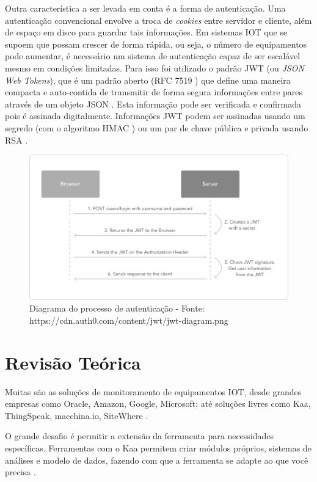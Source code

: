 Outra característica a ser levada em conta é a forma de autenticação.
Uma autenticação convencional envolve a troca de \emph{cookies} entre
servidor e cliente, além de espaço em disco para guardar tais
informações. Em sistemas IOT que se supoem que possam crescer de forma
rápida, ou seja, o número de equipamentos pode aumentar, é necessário um
sistema de autenticação capaz de ser escalável mesmo em condições
limitadas. Para isso foi utilizado o padrão JWT (ou \emph{JSON Web
Tokens}), que é um padrão aberto (RFC 7519 \cite{rfc7519-2015}) que
define uma maneira compacta e auto-contida de transmitir de forma segura
informações entre pares através de um objeto JSON \cite{jwt-2016}. Esta
informação pode ser verificada e confirmada pois é assinada
digitalmente. Informações JWT podem ser assinadas usando um segredo (com
o algoritmo HMAC \cite{rfc2104-1997}) ou um par de chave pública e
privada usando RSA \cite{rfc3447-2003}.

\begin{figure}[h]
    \centering
    \includegraphics[scale=0.3]{img/jwt-diagram-grey.png}
    \caption{Diagrama do processo de autenticação - Fonte: https://cdn.auth0.com/content/jwt/jwt-diagram.png}
\end{figure}

\section{Revisão Teórica}\label{revisuxe3o-teuxf3rica}

Muitas são as soluções de monitoramento de equipamentos IOT, desde
grandes empresas como Oracle, Amazon, Google, Microsoft; até soluções
livres como Kaa, ThingSpeak, macchina.io, SiteWhere
\cite{postscapes-iot-2016}.

O grande desafio é permitir a extensão da ferramenta para necessidades
específicas. Ferramentas com o Kaa permitem criar módulos próprios,
sistemas de análises e modelo de dados, fazendo com que a ferramenta se
adapte ao que você precisa \cite{kaa-2014}.

